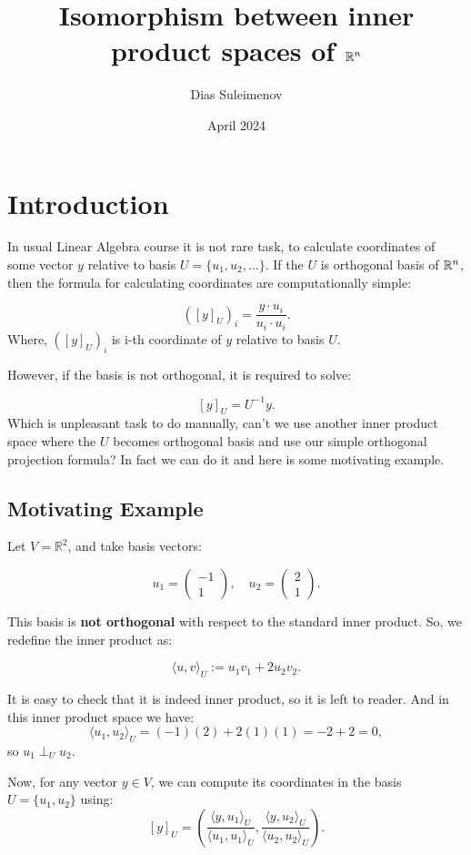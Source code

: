 \documentclass{article}
\title{Isomorphism between inner product spaces of $\mathbb{R}^n$}
\author{Dias Suleimenov}
\date{April 2024}
\begin{document}
\maketitle

\section*{Introduction}


In usual Linear Algebra course it is not rare task, to calculate coordinates of some vector $y$ relative to basis $U = \{u_1, u_2, ...\}$. If the $U$ is orthogonal basis of $\mathbb{R}^n$, then the formula for calculating coordinates are computationally simple:

\[
([y]_U)_i = \frac{y \cdot u_i}{u_i \cdot u_i}.
\]
Where, $([y]_U)_i$ is i-th coordinate of $y$ relative to basis $U$. 

However, if the basis is not orthogonal, it is required to solve:

\[
[y]_U = U^{-1}y.
\]
Which is unpleasant task to do manually, can't we use another inner product space where the $U$ becomes orthogonal basis and use our simple orthogonal projection formula? In fact we can do it and here is some motivating example.

\subsection*{Motivating Example}

Let \( V = \mathbb{R}^2 \), and take basis vectors:

\[
u_1 = \begin{pmatrix} -1 \\ 1 \end{pmatrix}, \quad u_2 = \begin{pmatrix} 2 \\ 1 \end{pmatrix}.
\]

This basis is \textbf{not orthogonal} with respect to the standard inner product. So, we redefine the inner product as:

\[
\langle u, v \rangle_U := u_1 v_1 + 2 u_2 v_2.
\]

It is easy to check that it is indeed inner product, so it is left to reader. And in this inner product space we have:
\[
\langle u_1, u_2 \rangle_U = (-1)(2) + 2(1)(1) = -2 + 2 = 0,
\]
so \( u_1 \perp_U u_2 \).

\bigskip

Now, for any vector \( y \in V \), we can compute its coordinates in the basis \( U = \{u_1, u_2\} \) using:
\[
[y]_U = \left( \frac{\langle y, u_1 \rangle_U}{\langle u_1, u_1 \rangle_U}, \frac{\langle y, u_2 \rangle_U}{\langle u_2, u_2 \rangle_U} \right).
\]
\end{document}
